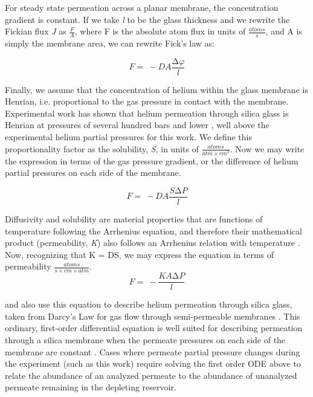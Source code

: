 For steady state permeation across a planar membrane, the concentration
gradient is constant. If we take \emph{l} to be the glass thickness and we
rewrite the Fickian flux \emph{J} as \(\frac{F}{A}\), where F is the
absolute atom flux in units of \(\frac{atoms}{s}\), and A is simply the
membrane area, we can rewrite Fick's law as:

\begin{equation}
F = \  - DA\frac{\mathrm{\Delta}\varphi}{l}
\label{eq:s1-2}
\end{equation}

Finally, we assume that the concentration of helium within the glass
membrane is Henrian, i.e. proportional to the gas pressure in contact
with the membrane. Experimental work has shown that helium permeation
through silica glass is Henrian at pressures of several hundred bars and
lower \citep{shelby1976}, well above the experimental helium partial
pressures for this work. We define this proportionality factor as the
solubility, \emph{S}, in units of \(\frac{atoms}{atm \times cm^{3}}\).
Now we may write the expression in terms of the gas pressure gradient,
or the difference of helium partial pressures on each side of the
membrane.

\begin{equation}
F = \  - DA\frac{S\mathrm{\Delta}P}{l}
\label{eq:s1-3}
\end{equation}

Diffusivity and solubility are material properties that are functions of
temperature following the Arrhenius equation, and therefore their
mathematical product (permeability, \emph{K}) also follows an Arrhenius
relation with temperature \citep{rogers1954,swets1961}.
Now, recognizing that K = DS, we may express the equation in terms of
permeability \(\frac{atoms}{s \times cm \times atm}\).
\begin{equation}
F = \  - \frac{KA\mathrm{\Delta}P}{l}
\label{eq:s1-4}
\end{equation}

\citet{studt1962} and \citet{masaryk1968} also use this equation to describe helium
permeation through silica glass, taken from Darcy's Law for gas flow
through semi-permeable membranes \citep{carman1956}. This ordinary,
first-order differential equation is well suited for describing
permeation through a silica membrane when the permeate pressures on each
side of the membrane are constant \citep{norton1953,altemose1961,swets1961}. Cases where permeate partial pressure changes
during the experiment (such as this work) require solving the first
order ODE above to relate the abundance of an analyzed permeate to the
abundance of unanalyzed permeate remaining in the depleting reservoir.

